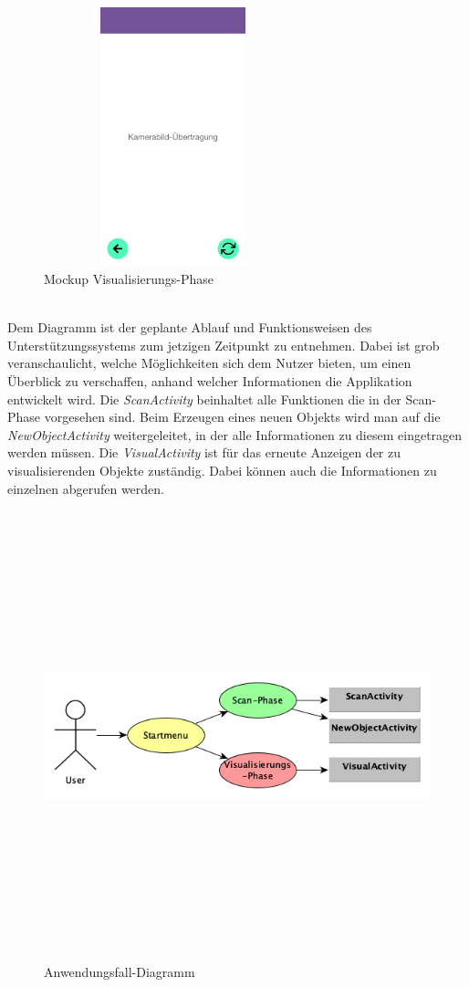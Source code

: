 \begin{figure}[hbt!]
    \centering
    \includegraphics[width=7.5cm,height=7.5cm,keepaspectratio]{3Konzeption/Bilder/Visual-Phase_AugmIS.png}
    \caption{Mockup Visualisierungs-Phase}
    \label{pic:Mocksvisual}
\end{figure}
\\
Dem Diagramm ist der geplante Ablauf und Funktionsweisen des Unterstützungssystems zum jetzigen Zeitpunkt zu entnehmen. Dabei ist grob 
veranschaulicht, welche Möglichkeiten sich dem Nutzer bieten, um einen Überblick zu verschaffen, anhand welcher Informationen die 
Applikation entwickelt wird. Die \textit{ScanActivity} beinhaltet alle Funktionen die in der Scan-Phase vorgesehen sind. Beim Erzeugen eines neuen Objekts 
wird man auf die \textit{NewObjectActivity} weitergeleitet, in der alle Informationen zu diesem eingetragen werden müssen. Die \textit{VisualActivity} ist für das 
erneute Anzeigen der zu visualisierenden Objekte zuständig. Dabei können auch die Informationen zu einzelnen abgerufen werden. 
\begin{figure}[hbt!]
    \centering
    \includegraphics[width=13cm,height=13cm,keepaspectratio]{3Konzeption/Bilder/Anwendungsfalldiagramm.png}
    \caption{Anwendungsfall-Diagramm}
    \label{pic:anwendungsfall}
\end{figure}
